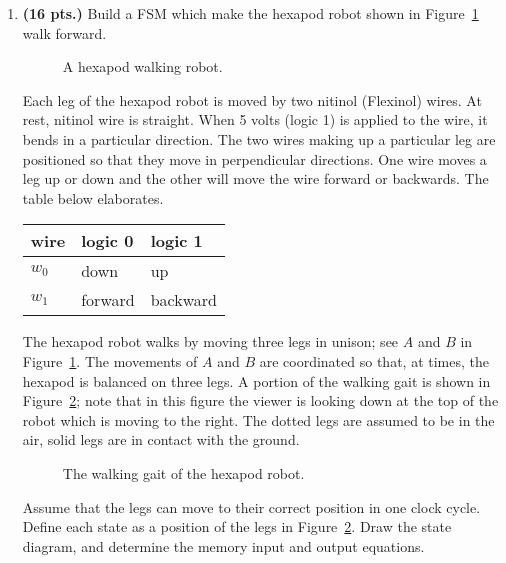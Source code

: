 \begin{enumerate}
    \item \textbf{ (16 pts.)}
        Build a FSM which make the hexapod robot shown in Figure~\ref{fig:hexapod}
        walk forward.

        \begin{figure}[ht]
            \caption{A hexapod walking robot.}
            \label{fig:hexapod}
        \end{figure}

        Each leg of the hexapod robot is moved by two nitinol (Flexinol) wires.
        At rest, nitinol wire is straight.  When 5 volts (logic 1) is applied to
        the wire, it bends in a particular direction.  The two wires making up
        a particular leg are positioned so that they move in perpendicular
        directions.  One wire moves a leg up or down and the other will move
        the wire forward or backwards.  The table below elaborates.

        \begin{tabular}{l|l|l}
            wire   & logic 0 & logic 1    \\ \hline
            $w_0$  & down     & up        \\ \hline
            $w_1$  & forward & backward    \\
        \end{tabular}

        The hexapod robot walks by moving three legs in unison; see $A$ and
        $B$ in Figure~\ref{fig:hexapod}.  The movements of $A$ and $B$ are
        coordinated so that, at times, the hexapod is balanced on three legs.
        A portion of the walking gait is shown in Figure~\ref{fig:hexgate};
        note that in this figure the viewer is looking down at the top of the
        robot which is moving to the right.  The dotted legs are assumed to be in
        the air, solid legs are in contact with the ground.

        \begin{figure}[ht]
            \caption{The walking gait of the hexapod robot.}
            \label{fig:hexgate}
        \end{figure}

        Assume that the legs can move to their correct position in one clock
        cycle.  Define each state as a position of the legs in
        Figure~\ref{fig:hexgate}. Draw the state diagram,
        and determine the memory input and output equations.


\end{enumerate}
